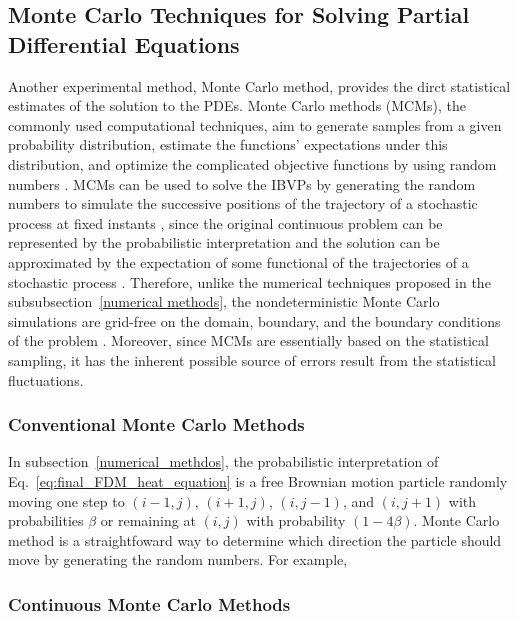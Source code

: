 \subsection{Monte Carlo Techniques for Solving Partial Differential Equations}

Another experimental method, Monte Carlo method, provides the dirct
statistical estimates of the solution to the PDEs. Monte Carlo methods
(MCMs), the commonly used computational techniques, aim to generate
samples from a given probability distribution, estimate the functions'
expectations under this distribution, and optimize the complicated
objective functions by using random numbers \cite{kroese2014monte}
\cite{rubinstein2016simulation}. MCMs can be used to solve the IBVPs
by generating the random numbers to simulate the successive positions
of the trajectory of a stochastic process at fixed instants
\cite{kronberg1976solution}\cite{king1951monte}, since the original
continuous problem can be represented by the probabilistic
interpretation and the solution can be approximated by the expectation
of some functional of the trajectories of a stochastic process
\cite{grebenkov2014efficient}\cite{sabelfeld2013random}. Therefore,
unlike the numerical techniques proposed in the
subsubsection~\ref{numerical methods}, the nondeterministic Monte
Carlo simulations are grid-free on the domain, boundary, and the
boundary conditions of the problem
\cite{grebenkov2014efficient}. Moreover, since MCMs are essentially
based on the statistical sampling, it has the inherent possible source
of errors result from the statistical fluctuations.


\subsubsection{Conventional Monte Carlo Methods}

In subsection~\ref{numerical_methdos}, the probabilistic
interpretation of Eq.~\ref{eq:final_FDM_heat_equation} is a free
Brownian motion particle randomly moving one step to $(i-1, j)$,
$(i+1, j)$, $(i, j-1)$, and $(i, j+1)$ with probabilities $\beta$ or
remaining at $(i, j)$ with probability $(1-4\beta)$. Monte Carlo
method is a straightfoward way to determine which direction the
particle should move by generating the random numbers. For example, 






\subsubsection{Continuous Monte Carlo Methods}



